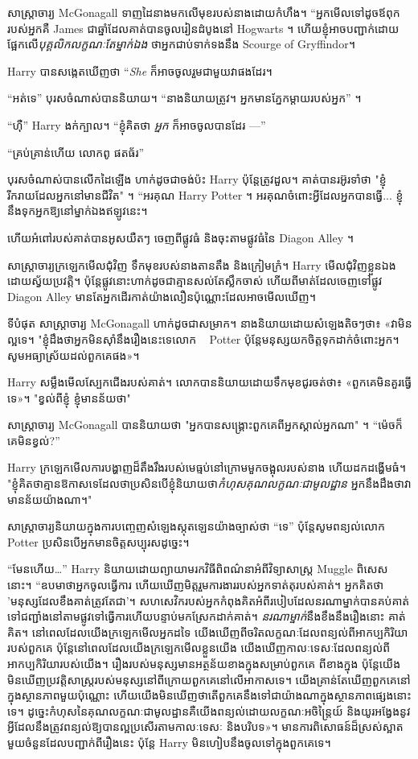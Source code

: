 សាស្ត្រាចារ្យ McGonagall ទាញដៃនាងមកលើមុខរបស់នាងដោយកំហឹង។ “អ្នកមើលទៅដូចឪពុករបស់អ្នកគឺ James ជាឆ្នាំដែលគាត់បានចូលរៀនដំបូងនៅ Hogwarts ។ ហើយខ្ញុំអាចបញ្ជាក់ដោយផ្អែកលើ\emph{បុគ្គលិកលក្ខណៈតែម្នាក់ឯង} ថាអ្នកជាប់ទាក់ទងនឹង Scourge of Gryffindor។

Harry បានសង្កេតឃើញថា “\emph{She} ក៏អាចចូលរួមជាមួយវាផងដែរ។

“អត់ទេ” បុរសចំណាស់បាននិយាយ។ “នាងនិយាយត្រូវ។ អ្នកមានភ្នែកម្តាយរបស់អ្នក” ។

“ហ៊ឺ” Harry ងក់ក្បាល។ “ខ្ញុំគិតថា \emph{អ្នក} ក៏អាចចូលបានដែរ —”

“គ្រប់គ្រាន់ហើយ លោកពូ ផតធ័រ”

បុរសចំណាស់បានលើកដៃឡើង ហាក់ដូចជាចង់ប៉ះ Harry ប៉ុន្តែត្រូវដួល។ គាត់បានរអ៊ូរទាំថា "ខ្ញុំរីករាយដែលអ្នកនៅមានជីវិត" ។ “អរគុណ Harry Potter ។ អរគុណចំពោះអ្វីដែលអ្នកបានធ្វើ... ខ្ញុំនឹងទុកអ្នកឱ្យនៅម្នាក់ឯងឥឡូវនេះ។

ហើយអំពៅរបស់គាត់បានអូសយឺតៗ ចេញពីផ្លូវធំ និងចុះតាមផ្លូវធំនៃ Diagon Alley ។

សាស្ត្រាចារ្យក្រឡេកមើលជុំវិញ ទឹកមុខរបស់នាងតានតឹង និងក្រៀមក្រំ។ Harry មើលជុំវិញខ្លួនឯងដោយស្វ័យប្រវត្តិ។ ប៉ុន្តែ​ផ្លូវ​នោះ​ហាក់​ដូច​ជា​គ្មាន​សល់​តែ​ស្លឹក​ចាស់ ហើយ​ពី​មាត់​ដែល​ចេញ​ទៅ​ផ្លូវ Diagon Alley មាន​តែ​អ្នក​ដើរ​កាត់​យ៉ាង​លឿន​ប៉ុណ្ណោះ​ដែល​អាច​មើល​ឃើញ។

ទីបំផុត សាស្រ្តាចារ្យ McGonagall ហាក់ដូចជាសម្រាក។ នាង​និយាយ​ដោយ​សំឡេង​តិចៗ​ថា​៖ «​វា​មិន​ល្អ​ទេ​។ "ខ្ញុំដឹងថាអ្នកមិនស៊ាំនឹងរឿងនេះទេលោក ~ Potter ប៉ុន្តែមនុស្សយកចិត្តទុកដាក់ចំពោះអ្នក។ សូមអធ្យាស្រ័យដល់ពួកគេផង»។

Harry សម្លឹងមើលស្បែកជើងរបស់គាត់។ លោក​បាន​និយាយ​ដោយ​ទឹក​មុខ​ជូរ​ចត់​ថា៖ «ពួកគេ​មិន​គួរ​ធ្វើ​ទេ»។ "ខ្វល់ពីខ្ញុំ ខ្ញុំមានន័យថា"

សាស្រ្តាចារ្យ McGonagall បាននិយាយថា "អ្នកបានសង្រ្គោះពួកគេពីអ្នកស្គាល់អ្នកណា" ។ “ម៉េចក៏គេមិនខ្វល់?”

Harry ក្រឡេកមើលការបង្ហាញដ៏តឹងរឹងរបស់មេធ្មប់នៅក្រោមមួកចង្អុលរបស់នាង ហើយដកដង្ហើមធំ។ "ខ្ញុំគិតថាគ្មានឱកាសទេដែលថាប្រសិនបើខ្ញុំនិយាយថា\emph{កំហុសគុណលក្ខណៈជាមូលដ្ឋាន} អ្នកនឹងដឹងថាវាមានន័យយ៉ាងណា។"

សាស្ត្រាចារ្យ​និយាយ​ក្នុង​ការ​បញ្ចេញ​សំឡេង​ស្កុតឡេន​យ៉ាង​ច្បាស់​ថា “ទេ” ប៉ុន្តែ​សូម​ពន្យល់​លោក ~ Potter ប្រសិន​បើ​អ្នក​មាន​ចិត្ត​សប្បុរស​ដូច្នេះ។

“មែនហើយ…” Harry និយាយដោយព្យាយាមរកវិធីពិពណ៌នាអំពីវិទ្យាសាស្ត្រ Muggle ពិសេសនោះ។ “ឧបមាថាអ្នកចូលធ្វើការ ហើយឃើញមិត្តរួមការងាររបស់អ្នកទាត់តុរបស់គាត់។ អ្នក​គិត​ថា 'មនុស្ស​ដែល​ខឹង​គាត់​ត្រូវ​តែ​ជា'។ សហសេវិករបស់អ្នកកំពុងគិតអំពីរបៀបដែលនរណាម្នាក់បានគប់គាត់ទៅជញ្ជាំងនៅតាមផ្លូវទៅធ្វើការហើយបន្ទាប់មកស្រែកដាក់គាត់។ \emph{នរណាម្នាក់}នឹងខឹងនឹងរឿងនោះ គាត់គិត។ នៅពេលដែលយើងក្រឡេកមើលអ្នកដទៃ យើងឃើញពីចរិតលក្ខណៈដែលពន្យល់ពីអាកប្បកិរិយារបស់ពួកគេ ប៉ុន្តែនៅពេលដែលយើងក្រឡេកមើលខ្លួនយើង យើងឃើញកាលៈទេសៈដែលពន្យល់ពីអាកប្បកិរិយារបស់យើង។ រឿងរបស់មនុស្សមានអត្ថន័យខាងក្នុងសម្រាប់ពួកគេ ពីខាងក្នុង ប៉ុន្តែយើងមិនឃើញប្រវត្តិសាស្ត្ររបស់មនុស្សនៅពីក្រោយពួកគេនៅលើអាកាសទេ។ យើងគ្រាន់តែឃើញពួកគេនៅក្នុងស្ថានភាពមួយប៉ុណ្ណោះ ហើយយើងមិនឃើញថាតើពួកគេនឹងទៅជាយ៉ាងណាក្នុងស្ថានភាពផ្សេងនោះទេ។ ដូច្នេះ​កំហុស​នៃ​គុណលក្ខណៈ​ជា​មូលដ្ឋាន​គឺ​យើង​ពន្យល់​ដោយ​លក្ខណៈ​អចិន្ត្រៃយ៍ និង​យូរអង្វែង​នូវ​អ្វី​ដែល​នឹង​ត្រូវ​ពន្យល់​ឱ្យ​បាន​ល្អ​ប្រសើរ​តាម​កាលៈទេសៈ និង​បរិបទ»។ មាន​ការ​ពិសោធន៍​ដ៏​ស្រស់​ស្អាត​មួយ​ចំនួន​ដែល​បញ្ជាក់​ពី​រឿង​នេះ ប៉ុន្តែ Harry មិន​ហៀប​នឹង​ចូល​ទៅ​ក្នុង​ពួក​គេ​ទេ។

